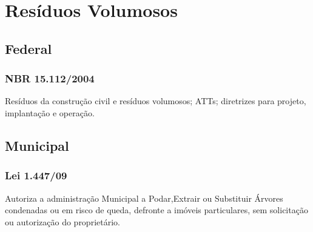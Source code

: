 \section{Resíduos Volumosos}
\begin{subapend}
	\subsection{Federal}
	\begin{subsubapend}
		\subsubsection{NBR 15.112/2004}
		Resíduos da construção civil e resíduos volumosos; ATTs; diretrizes para projeto, implantação e operação.
	\end{subsubapend}
\end{subapend}

\begin{subapend}
	\subsection{Municipal}
	\begin{subsubapend}
		\subsubsection{Lei 1.447/09}
		Autoriza a administração Municipal a Podar,Extrair ou Substituir Árvores condenadas ou em risco de queda, defronte a imóveis particulares, sem solicitação ou autorização do proprietário.
	\end{subsubapend}
\end{subapend}



